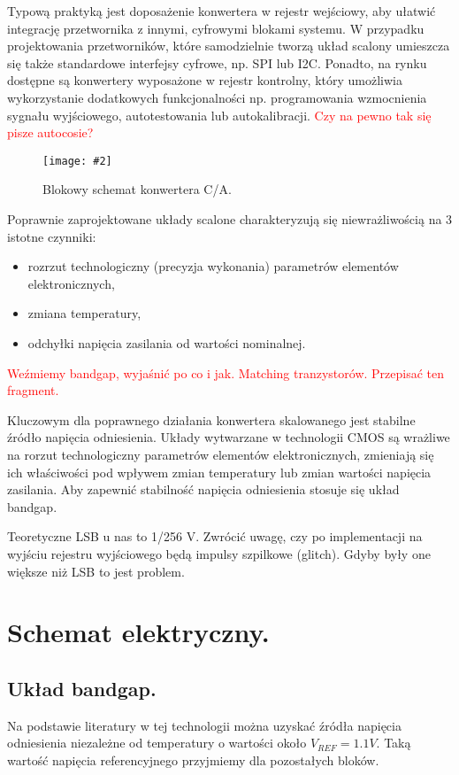 \documentclass[10pt,a4paper]{report}
\newcommand{\img}[4]{
	\begin{figure}[H]
		\begin{center}
			\texttt{[image: \#2]}
			\caption{#3}
			\label{#4}
		\end{center}
	\end{figure}
}
\begin{document}
	{	Typową praktyką jest doposażenie konwertera w rejestr wejściowy, aby ułatwić integrację przetwornika z innymi, cyfrowymi blokami systemu. W przypadku projektowania przetworników, które samodzielnie tworzą układ scalony umieszcza się także standardowe interfejsy cyfrowe, np. SPI lub I2C. Ponadto, na rynku dostępne są konwertery wyposażone w rejestr kontrolny, który umożliwia wykorzystanie dodatkowych funkcjonalności np. programowania wzmocnienia sygnału wyjściowego, autotestowania lub autokalibracji. \textcolor{red}{Czy na pewno tak się pisze autocosie?}
		\img{20}{../visio/blokschkonca.pdf}{Blokowy schemat konwertera C/A.}{blokschkonca} }

	{	Poprawnie zaprojektowane układy scalone charakteryzują się niewrażliwością na 3 istotne czynniki:
		\begin{itemize}
			\item rozrzut technologiczny (precyzja wykonania) parametrów elementów elektronicznych,
			\item zmiana temperatury,
			\item odchyłki napięcia zasilania od wartości nominalnej.
		\end{itemize}
		\textcolor{red}{Weźmiemy bandgap, wyjaśnić po co i jak. Matching tranzystorów. Przepisać ten fragment.}	}
	
	{	Kluczowym dla poprawnego działania konwertera skalowanego jest stabilne źródło napięcia odniesienia. Układy wytwarzane w technologii CMOS są wrażliwe na rorzut technologiczny parametrów elementów elektronicznych, zmieniają się ich właściwości pod wpływem zmian temperatury lub zmian wartości napięcia zasilania. Aby zapewnić stabilność napięcia odniesienia stosuje się układ bandgap. }

	{	Teoretyczne LSB u nas to 1/256 V. Zwrócić uwagę, czy po implementacji na wyjściu rejestru wyjściowego będą impulsy szpilkowe (glitch). Gdyby były one większe niż LSB to jest problem.
		}
	\chapter{Schemat elektryczny.}
	\section{Układ bandgap.}
	{ 	Na podstawie literatury w tej technologii można uzyskać źródła napięcia odniesienia niezależne od temperatury o wartości około $V_{REF}=1.1V$. Taką wartość napięcia referencyjnego przyjmiemy dla pozostałych bloków. }
	
\end{document}
